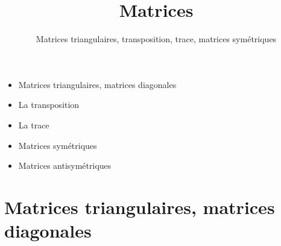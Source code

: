 


\usetikzlibrary{fit}					%
\usetikzlibrary{backgrounds}	%
\usetikzlibrary{matrix}





\title{{\bf Matrices}}
\subtitle{Matrices triangulaires, transposition, trace, matrices symétriques}

\begin{frame}
  
  \debutmontitre

  \pause

{\footnotesize
\hfill
{}
\begin{minipage}{0.6\textwidth}
  \begin{itemize}
    \item<3-> Matrices triangulaires, matrices diagonales
    \item<4-> La transposition
    \item<5-> La trace
    \item<6-> Matrices symétriques
    \item<7-> Matrices antisymétriques  
  \end{itemize}
\end{minipage}
}

\end{frame}

\setcounter{framenumber}{0}



\section{Matrices triangulaires, matrices diagonales}

